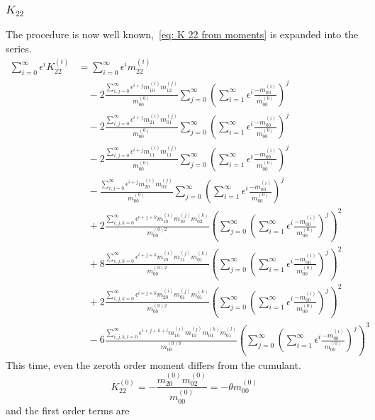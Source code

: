 \subsubsection{\texorpdfstring{$K_{22}$}{K 22}}
\label{subs:K 22}
The procedure is now well known,~\eqref{eq: K 22 from moments} is expanded into the series.
\begin{equation}
  \begin{aligned}
  \sum_{i=0}^\infty \epsilon^i K_{22}^{(i)}
  & = \sum_{i=0}^\infty \epsilon^i m_{22}^{(i)}
  \\& \quad
  - 2 \frac{ \sum_{i,j=0}^\infty \epsilon^{i+j} m_{10}^{(i)} m_{12}^{(j)} }{m_{00}^{(0)}}
   \sum_{j=0}^\infty {\left(\sum_{i=1}^\infty \epsilon^i \frac{ - m_{00}^{(i)}}{ m_{00}^{(0)}}\right)}^j
  \\& \quad
  - 2 \frac{ \sum_{i,j=0}^\infty \epsilon^{i+j} m_{21}^{(i)} m_{01}^{(j)} }{m_{00}^{(0)}}
   \sum_{j=0}^\infty {\left(\sum_{i=1}^\infty \epsilon^i \frac{ - m_{00}^{(i)}}{ m_{00}^{(0)}}\right)}^j
  \\& \quad
  - 2 \frac{ \sum_{i,j=0}^\infty \epsilon^{i+j} m_{11}^{(i)} m_{11}^{(j)} }{m_{00}^{(0)}}
   \sum_{j=0}^\infty {\left(\sum_{i=1}^\infty \epsilon^i \frac{ - m_{00}^{(i)}}{ m_{00}^{(0)}}\right)}^j
  \\& \quad
  -   \frac{ \sum_{i,j=0}^\infty \epsilon^{i+j} m_{20}^{(i)} m_{02}^{(j)} }{m_{00}^{(0)}}
   \sum_{j=0}^\infty {\left(\sum_{i=1}^\infty \epsilon^i \frac{ - m_{00}^{(i)}}{ m_{00}^{(0)}}\right)}^j
  \\& \quad
  + 2 \frac{ \sum_{i,j,k=0}^\infty \epsilon^{i+j+k} m_{10}^{(i)}m_{10}^{(j)}m_{02}^{(k)} }
  {m_{00}^{(0)2}}
   {\left(
     \sum_{j=0}^\infty {\left(\sum_{i=1}^\infty \epsilon^i \frac{ - m_{00}^{(i)}}{ m_{00}^{(0)}}\right)}^j
   \right)}^2
  \\& \quad
  + 8 \frac{ \sum_{i,j,k=0}^\infty \epsilon^{i+j+k} m_{10}^{(i)}m_{11}^{(j)}m_{01}^{(k)} }
  {m_{00}^{(0)2}}
   {\left(
     \sum_{j=0}^\infty {\left(\sum_{i=1}^\infty \epsilon^i \frac{ - m_{00}^{(i)}}{ m_{00}^{(0)}}\right)}^j
   \right)}^2
  \\& \quad
  + 2 \frac{ \sum_{i,j,k=0}^\infty \epsilon^{i+j+k} m_{20}^{(i)}m_{01}^{(j)}m_{01}^{(k)} }
  {m_{00}^{(0)2}}
   {\left(
     \sum_{j=0}^\infty {\left(\sum_{i=1}^\infty \epsilon^i \frac{ - m_{00}^{(i)}}{ m_{00}^{(0)}}\right)}^j
   \right)}^2
  \\& \quad
  - 6 \frac{ \sum_{i,j,k,l=0}^\infty \epsilon^{i+j+k+l} m_{10}^{(i)}m_{10}^{(j)}m_{01}^{(k)}m_{01}^{(l)}}{m_{00}^{(0)3}}
   {\left(
     \sum_{j=0}^\infty {\left(\sum_{i=1}^\infty \epsilon^i \frac{ - m_{00}^{(i)}}{ m_{00}^{(0)}}\right)}^j
   \right)}^3
   \end{aligned}
 \end{equation}
This time, even the zeroth order moment differs from the cumulant.
\begin{equation}
  K_{22}^{(0)}
  = - \frac{ m_{20}^{(0)} m_{02}^{(0)} }{m_{00}^{(0)}} = -\theta m_{00}^{(0)}
 \end{equation}
and the first order terms are

